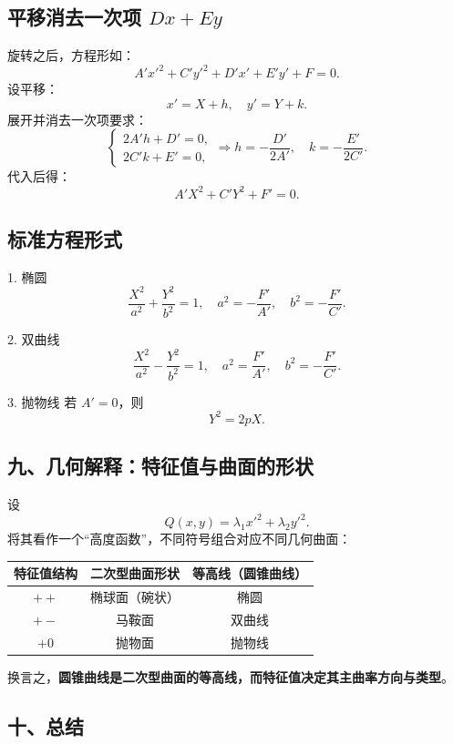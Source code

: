 \documentclass{ctexart}
\begin{document}
\subsection{平移消去一次项 \texorpdfstring{\(Dx + Ey\)}{Dx + Ey}}

旋转之后，方程形如：
\[
A'x'^2 + C'y'^2 + D'x' + E'y' + F = 0.
\]
设平移：
\[
x' = X + h,\quad y' = Y + k.
\]
展开并消去一次项要求：
\[
\begin{cases}
	2A'h + D' = 0,\\
	2C'k + E' = 0,
\end{cases}
\Rightarrow
h = -\dfrac{D'}{2A'}, \quad k = -\dfrac{E'}{2C'}.
\]
代入后得：
\[
A'X^2 + C'Y^2 + F' = 0.
\]


\subsection{标准方程形式}

1. 椭圆
\[
\frac{X^2}{a^2} + \frac{Y^2}{b^2} = 1, \quad
a^2 = -\frac{F'}{A'},\quad b^2 = -\frac{F'}{C'}.
\]

2. 双曲线
\[
\frac{X^2}{a^2} - \frac{Y^2}{b^2} = 1, \quad
a^2 = \frac{F'}{A'},\quad b^2 = -\frac{F'}{C'}.
\]

3. 抛物线
若 \(A' = 0\)，则
\[
Y^2 = 2pX.
\]


\subsection*{九、几何解释：特征值与曲面的形状}

设
\[
Q(x, y) = \lambda_1 x'^2 + \lambda_2 y'^2.
\]
将其看作一个“高度函数”，不同符号组合对应不同几何曲面：

\begin{table}[ht]
	\centering
	\begin{tabular}{|c|c|c|}
		\hline
		特征值结构 & 二次型曲面形状 & 等高线（圆锥曲线）  \\
		\hline
		 \(++\) & 椭球面（碗状） & 椭圆 \\
		\hline
		\(+-\) & 马鞍面 & 双曲线 \\
		\hline
		\(+0\) & 抛物面 & 抛物线 \\
		\hline
	\end{tabular}
\end{table}

换言之，\textbf{圆锥曲线是二次型曲面的等高线，而特征值决定其主曲率方向与类型}。

\subsection*{十、总结}
\end{document}
